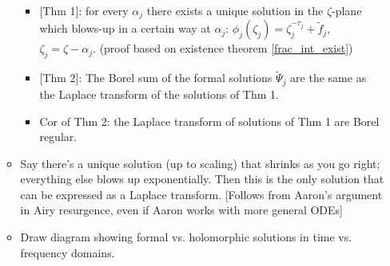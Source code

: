 \documentclass{article}
\begin{document}
\begin{itemize}
\begin{itemize}
\begin{itemize}
\item {[Thm 1]}: for every $\alpha_j$ there exists a unique solution in the $\zeta$-plane which blows-up in a certain way at $\alpha_j$: ${\phi}_j(\zeta_j)=\zeta_j^{-\tau_j}+\tilde{f}_j$, $\zeta_j=\zeta-\alpha_j$. (proof based on existence theorem \ref{frac_int_exist})
\item {[Thm 2]}: The Borel sum of the formal solutions $\tilde{\Psi}_j$ are the same as the Laplace transform of the solutions of Thm 1. 
\item Cor of Thm 2: the Laplace transform of solutions of Thm 1 are Borel regular.   
\end{itemize}
\item Say there's a unique solution (up to scaling) that shrinks as you go right; everything else blows up exponentially. Then this is the only solution that can be expressed as a Laplace transform. [Follows from Aaron's argument in Airy resurgence, even if Aaron works with more general ODEs]
\color{DarkBlue}
\item Draw diagram showing formal vs. holomorphic solutions in time vs. frequency domains.

\begin{center}
\end{center}


\end{itemize}
\end{itemize}
\end{document}

